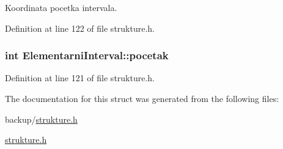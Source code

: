 Koordinata pocetka intervala. 



Definition at line 122 of file strukture.\-h.

\hypertarget{struct_elementarni_interval_a1c9c457301eff27c5229e38be6a49419}{
\subsubsection[{pocetak}]{\setlength{\rightskip}{0pt plus 5cm}int Elementarni\-Interval\-::pocetak}}\label{struct_elementarni_interval_a1c9c457301eff27c5229e38be6a49419}


Definition at line 121 of file strukture.\-h.



The documentation for this struct was generated from the following files\-:\begin{DoxyCompactItemize}
\item 
backup/\hyperlink{backup_2strukture_8h}{strukture.\-h}\item 
\hyperlink{strukture_8h}{strukture.\-h}\end{DoxyCompactItemize}
